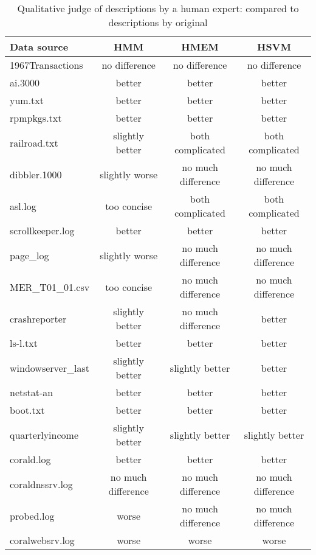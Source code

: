 \begin{table}
\begin{center}
\begin{tabular}{|l||c|c|c|}\hline
Data source & HMM & HMEM & HSVM \\ \hline 
1967Transactions & no difference & no difference & no difference   \\\hline 
ai.3000 & better & better & better \\ \hline
yum.txt & better &  better & better \\ \hline
rpmpkgs.txt & better & better & better\\ \hline
railroad.txt & slightly better & both complicated & both complicated  \\ \hline
dibbler.1000 & slightly worse & no much difference & no much difference   \\ \hline
asl.log & too concise & both complicated & both complicated \\ \hline
scrollkeeper.log  &  better & better & better \\ \hline
page\_log  & slightly worse & no much difference & no much difference \\ \hline
MER\_T01\_01.csv & too concise & no much difference & no much difference \\ \hline
crashreporter & slightly better & no much difference & better \\ \hline
ls-l.txt & better & better & better \\ \hline
windowserver\_last & slightly better & slightly better & better \\ \hline
netstat-an & better & better & better \\ \hline
boot.txt & better &  better & better \\ \hline
quarterlyincome & slightly better & slightly better & slightly better   \\ \hline
corald.log & better &  better & better \\ \hline
coraldnssrv.log  & no much difference &  no much difference & no much difference\\ \hline
probed.log & worse & no much difference & no much difference \\ \hline
coralwebsrv.log & worse & worse & worse \\\hline
\end{tabular}
\caption{Qualitative judge of descriptions by a human expert: compared
to descriptions by original \learnpads{}}
\label{tab:expert}
\end{center}
\end{table}

